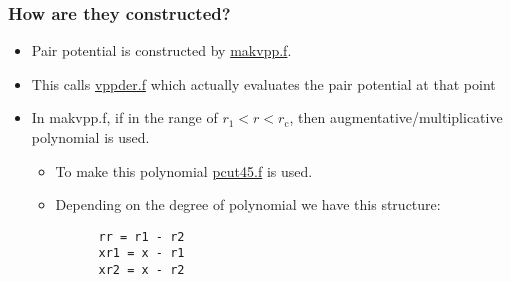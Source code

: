 \documentclass[11pt]{article}
\begin{document}
\subsubsection{How are they constructed?}
\label{sec:org014081e}
\begin{itemize}
\item Pair potential is constructed by \href{file:///home/tigany/lm/tb/makvpp.f}{makvpp.f}.
\item This calls \href{file:///home/tigany/lm/tb/vppder.f}{vppder.f} which actually evaluates the pair potential at that
point
\item In makvpp.f, if in the range of \(r_1 < r < r_{\text{c}}\), then
augmentative/multiplicative polynomial is used.
\begin{itemize}
\item To make this polynomial \href{file:///home/tigany/lm/tb/pcut45.f}{pcut45.f} is used.
\item Depending on the degree of polynomial we have this structure:
\begin{verbatim}
      rr = r1 - r2
      xr1 = x - r1
      xr2 = x - r2


\end{verbatim}
\end{itemize}
\end{itemize}
\end{document}
